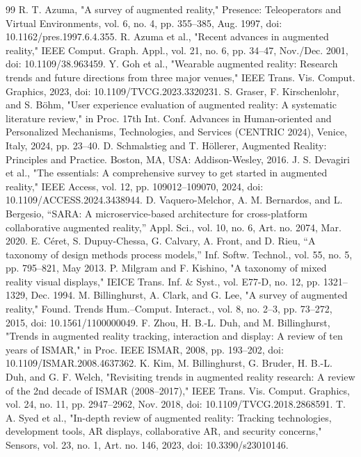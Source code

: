 \documentclass[conference]{IEEEtran}
\begin{document}
\begin{thebibliography}{99}
 R. T. Azuma, "A survey of augmented reality," Presence: Teleoperators and Virtual Environments, vol. 6, no. 4, pp. 355–385, Aug. 1997, doi: 10.1162/pres.1997.6.4.355.
 R. Azuma et al., "Recent advances in augmented reality," IEEE Comput. Graph. Appl., vol. 21, no. 6, pp. 34–47, Nov./Dec. 2001, doi: 10.1109/38.963459.
 Y. Goh et al., "Wearable augmented reality: Research trends and future directions from three major venues," IEEE Trans. Vis. Comput. Graphics, 2023, doi: 10.1109/TVCG.2023.3320231.
 S. Graser, F. Kirschenlohr, and S. Böhm, "User experience evaluation of augmented reality: A systematic literature review," in Proc. 17th Int. Conf. Advances in Human-oriented and Personalized Mechanisms, Technologies, and Services (CENTRIC 2024), Venice, Italy, 2024, pp. 23–40.
 D. Schmalstieg and T. Höllerer, Augmented Reality: Principles and Practice. Boston, MA, USA: Addison-Wesley, 2016.
 J. S. Devagiri et al., "The essentials: A comprehensive survey to get started in augmented reality," IEEE Access, vol. 12, pp. 109012–109070, 2024, doi: 10.1109/ACCESS.2024.3438944.
 D. Vaquero-Melchor, A. M. Bernardos, and L. Bergesio, ``SARA: A microservice-based architecture for cross-platform collaborative augmented reality,'' Appl. Sci., vol. 10, no. 6, Art. no. 2074, Mar. 2020.
 E. Céret, S. Dupuy-Chessa, G. Calvary, A. Front, and D. Rieu, ``A taxonomy of design methods process models,'' Inf. Softw. Technol., vol. 55, no. 5, pp. 795–821, May 2013.
 P. Milgram and F. Kishino, "A taxonomy of mixed reality visual displays," IEICE Trans. Inf. \& Syst., vol. E77-D, no. 12, pp. 1321–1329, Dec. 1994.
 M. Billinghurst, A. Clark, and G. Lee, "A survey of augmented reality," Found. Trends Hum.–Comput. Interact., vol. 8, no. 2–3, pp. 73–272, 2015, doi: 10.1561/1100000049.
 F. Zhou, H. B.-L. Duh, and M. Billinghurst, "Trends in augmented reality tracking, interaction and display: A review of ten years of ISMAR," in Proc. IEEE ISMAR, 2008, pp. 193–202, doi: 10.1109/ISMAR.2008.4637362.
 K. Kim, M. Billinghurst, G. Bruder, H. B.-L. Duh, and G. F. Welch, "Revisiting trends in augmented reality research: A review of the 2nd decade of ISMAR (2008–2017)," IEEE Trans. Vis. Comput. Graphics, vol. 24, no. 11, pp. 2947–2962, Nov. 2018, doi: 10.1109/TVCG.2018.2868591.
 T. A. Syed et al., "In-depth review of augmented reality: Tracking technologies, development tools, AR displays, collaborative AR, and security concerns," Sensors, vol. 23, no. 1, Art. no. 146, 2023, doi: 10.3390/s23010146.

\end{thebibliography}
\end{document}
